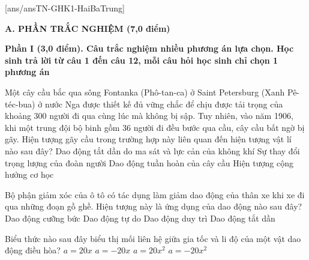 [ans/ansTN-GHK1-HaiBaTrung]

\noindent \textbf{A. PHẦN TRẮC NGHIỆM (7,0 điểm)}

\noindent \textbf{Phần I (3,0 điểm). Câu trắc nghiệm nhiều phương án lựa chọn. Học sinh trả lời từ câu 1 đến câu 12, mỗi câu hỏi học sinh chỉ chọn 1 phương án}
\vspace{0.2cm}

\begin{ex}	Một cây cầu bắc qua sông Fontanka (Phô-tan-ca) ở Saint Petersburg (Xanh Pê-téc-bua) ở nước Nga được thiết kế đủ vững chắc để chịu được tải trọng của khoảng 300 người đi qua cùng lúc mà không bị sập. Tuy nhiên, vào năm 1906, khi một trung đội bộ binh gồm 36 người đi đều bước qua cầu, cây cầu bất ngờ bị gãy. Hiện tượng gãy cầu trong trường hợp này liên quan đến hiện tượng vật lí nào sau đây?
	\choice
	{Dao động tắt dần do ma sát và lực cản của không khí}
	{Sự thay đổi trọng lượng của đoàn người}
	{Dao động tuần hoàn của cây cầu}
	{\True Hiện tượng cộng hưởng cơ học}
\end{ex}

\begin{ex}	Bộ phận giảm xóc của ô tô có tác dụng làm giảm dao động của thân xe khi xe đi qua những đoạn gồ ghề. Hiện tượng này là ứng dụng của dao động nào sau đây?
	\choice
	{Dao động cưỡng bức}
	{Dao động tự do}
	{Dao động duy trì}
	{\True Dao động tắt dần}
\end{ex}

\begin{ex}	Biểu thức nào sau đây biểu thị mối liên hệ giữa gia tốc và li độ của một vật dao động điều hòa?
	\choice
	{$a = 20x$}
	{\True $a = -20x$}
	{$a = 20x^2$}
	{$a = -20x^2$}
\end{ex}

